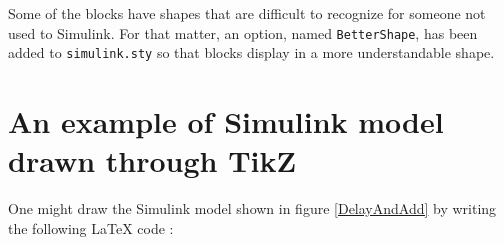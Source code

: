 \documentclass[a4paper]{article}
\begin{document}
    Some of the blocks have shapes that are difficult to recognize for someone
    not used to Simulink. For that matter, an option, named
    \texttt{BetterShape}, has been added to \texttt{simulink.sty} so that
    blocks display in a more understandable shape.

\section{An example of Simulink model drawn through TikZ}
\begin{center}
    
     \label{DelayAndAdd}
\end{center}
    One might draw the Simulink model shown in figure \ref{DelayAndAdd} by
writing the following \LaTeX{} code :

\end{document}
